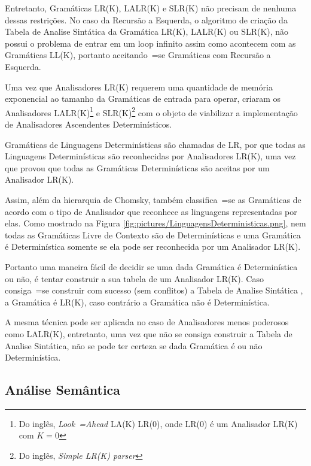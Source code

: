 {    Entretanto,
    Gramáticas LR(K), LALR(K) e
    SLR(K) não precisam de nenhuma dessas restrições.
    No caso da Recursão a Esquerda,
    o algoritmo de criação da Tabela de Analise Sintática da Gramática LR(K),
    LALR(K) ou SLR(K),
    não possui o problema de entrar em um loop infinito assim como acontecem com as Gramáticas LL(K),
    portanto aceitando~=se Gramáticas com Recursão a Esquerda.

    Uma vez que Analisadores LR(K) requerem uma quantidade de memória exponencial \cite{complexityOfLRKTesting} ao tamanho da Gramáticas de entrada para operar,
     criaram os Analisadores LALR(K)\footnote{
    Do inglês, \textit{Look~=Ahead} LA(K) LR(0),
    onde LR(0) é um Analisador LR(K) com $K=0$
    }
    e SLR(K)\footnote{
    Do inglês, \textit{Simple LR(K) parser}
    }
    com o objeto de viabilizar a implementação de Analisadores Ascendentes Determinísticos.

    Gramáticas de Linguagens Determinísticas são chamadas de LR,
    por que todas as Linguagens Determinísticas são reconhecidas por Analisadores LR(K),
    uma vez que  provou que todas as Gramáticas Determinísticas são aceitas por um Analisador LR(K).

    Assim,
    além da hierarquia de Chomsky,
    também classifica~=se as Gramáticas de acordo com o tipo de Analisador que reconhece as linguagens representadas por elas.
    Como mostrado na Figura \ref{fig:pictures/LinguagensDeterministicas.png},
    nem todas as Gramáticas Livre de Contexto são de Determinísticas e
    uma Gramática é Determinística somente se ela pode ser reconhecida por um Analisador LR(K).

    Portanto uma maneira fácil de decidir se uma dada Gramática é Determinística ou
    não,
    é tentar construir a sua tabela de um Analisador LR(K).
    Caso consiga~=se construir com sucesso (sem conflitos) a Tabela de Analise Sintática \cite{ahoCompilerDragonBook},
    a Gramática é LR(K),
    caso contrário a Gramática não é Determinística.

    A mesma técnica pode ser aplicada no caso de Analisadores menos poderosos como LALR(K),
    entretanto,
    uma vez que não se consiga construir a Tabela de Analise Sintática,
    não se pode ter certeza se dada Gramática é ou não Determinística.


\subsection{Análise Semântica}

}
